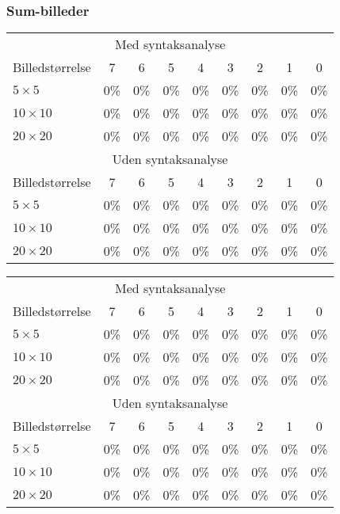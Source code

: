 \subsubsection*{Sum-billeder}

\begin{tabular}{|l|c|c|c|c|c|c|c|c|}\hline
\rowcolor[gray]{0.9} \multicolumn{9}{|>{\columncolor[gray]{0.9}}c|}{\textbf{Træningssæt}} \\\hline
\multicolumn{9}{|c|}{Med syntaksanalyse}\\\hline
Billedstørrelse & 7 & 6 & 5 & 4 & 3 & 2 & 1 & 0\\\hline
$5 \times 5$ & 0\% & 0\% & 0\% & 0\% & 0\% & 0\% & 0\% & 0\% \\\hline
$10 \times 10$ & 0\% & 0\% & 0\% & 0\% & 0\% & 0\% & 0\% & 0\%\\\hline
$20 \times 20$ & 0\% & 0\% & 0\% & 0\% & 0\% & 0\% & 0\% & 0\%\\\hline 
\multicolumn{9}{|c|}{Uden syntaksanalyse}\\\hline
Billedstørrelse & 7 & 6 & 5 & 4 & 3 & 2 & 1 & 0\\\hline
$5 \times 5$ & 0\% & 0\% & 0\% & 0\% & 0\% & 0\% & 0\% & 0\% \\\hline
$10 \times 10$ & 0\% & 0\% & 0\% & 0\% & 0\% & 0\% & 0\% & 0\%\\\hline
$20 \times 20$ & 0\% & 0\% & 0\% & 0\% & 0\% & 0\% & 0\% & 0\%\\\hline \end{tabular}

\begin{tabular}{|l|c|c|c|c|c|c|c|c|}\hline
\rowcolor[gray]{0.9} \multicolumn{9}{|>{\columncolor[gray]{0.9}}c|}{\textbf{Kontrolsæt}} \\\hline
\multicolumn{9}{|c|}{Med syntaksanalyse}\\\hline
Billedstørrelse & 7 & 6 & 5 & 4 & 3 & 2 & 1 & 0\\\hline
$5 \times 5$ & 0\% & 0\% & 0\% & 0\% & 0\% & 0\% & 0\% & 0\% \\\hline
$10 \times 10$ & 0\% & 0\% & 0\% & 0\% & 0\% & 0\% & 0\% & 0\%\\\hline
$20 \times 20$ & 0\% & 0\% & 0\% & 0\% & 0\% & 0\% & 0\% & 0\%\\\hline 
\multicolumn{9}{|c|}{Uden syntaksanalyse}\\\hline
Billedstørrelse & 7 & 6 & 5 & 4 & 3 & 2 & 1 & 0\\\hline
$5 \times 5$ & 0\% & 0\% & 0\% & 0\% & 0\% & 0\% & 0\% & 0\% \\\hline
$10 \times 10$ & 0\% & 0\% & 0\% & 0\% & 0\% & 0\% & 0\% & 0\%\\\hline
$20 \times 20$ & 0\% & 0\% & 0\% & 0\% & 0\% & 0\% & 0\% & 0\%\\\hline \end{tabular}

